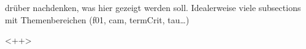 \begin{frame}
  drüber nachdenken, was hier gezeigt werden soll. Idealerweise viele 
  subsections mit Themenbereichen (f01, cam, termCrit, tau\ldots)
\end{frame}<++>
